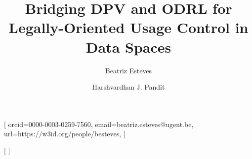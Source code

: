 \documentclass{ceurart}
\begin{document}



\title{Bridging DPV and ODRL for Legally-Oriented Usage Control in Data Spaces}

\author[1]{Beatriz Esteves}[%
orcid=0000-0003-0259-7560,
email=beatriz.esteves@ugent.be,
url=https://w3id.org/people/besteves,
]
\cormark[1]

\author[2]{Harshvardhan J. Pandit}[%
]

\address[1]{IDLab, Department of Electronics and Information Systems, Ghent University -- imec, Ghent, Belgium}
\address[2]{AI Accountability Lab (AIAL), Trinity College Dublin, Dublin, Ireland}
\end{document}
